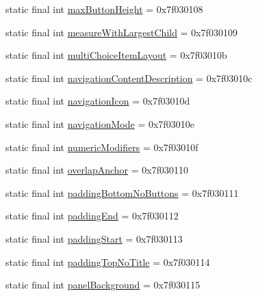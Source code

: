 \begin{DoxyCompactItemize}
static final int \mbox{\hyperlink{classandroid_1_1support_1_1v7_1_1appcompat_1_1R_1_1attr_a054ee0cbd26c24cb30705753307ccde3}{max\+Button\+Height}} = 0x7f030108
\item 
static final int \mbox{\hyperlink{classandroid_1_1support_1_1v7_1_1appcompat_1_1R_1_1attr_a421389c4bdd630f16a260d6166745aa8}{measure\+With\+Largest\+Child}} = 0x7f030109
\item 
static final int \mbox{\hyperlink{classandroid_1_1support_1_1v7_1_1appcompat_1_1R_1_1attr_aff39b926d2e9012794202b8b6f9a0d92}{multi\+Choice\+Item\+Layout}} = 0x7f03010b
\item 
static final int \mbox{\hyperlink{classandroid_1_1support_1_1v7_1_1appcompat_1_1R_1_1attr_ad1123c667a7f56bf93873c4fdd514e58}{navigation\+Content\+Description}} = 0x7f03010c
\item 
static final int \mbox{\hyperlink{classandroid_1_1support_1_1v7_1_1appcompat_1_1R_1_1attr_a2adad3c9532705970eaaa826317fba55}{navigation\+Icon}} = 0x7f03010d
\item 
static final int \mbox{\hyperlink{classandroid_1_1support_1_1v7_1_1appcompat_1_1R_1_1attr_a27c70295f7cf8714ed8f97d4e89ffb06}{navigation\+Mode}} = 0x7f03010e
\item 
static final int \mbox{\hyperlink{classandroid_1_1support_1_1v7_1_1appcompat_1_1R_1_1attr_a0da3a102e7d4ddecb4cebfe2e430c0a0}{numeric\+Modifiers}} = 0x7f03010f
\item 
static final int \mbox{\hyperlink{classandroid_1_1support_1_1v7_1_1appcompat_1_1R_1_1attr_aff68b243ea6c12550257c7d3c81c7cf8}{overlap\+Anchor}} = 0x7f030110
\item 
static final int \mbox{\hyperlink{classandroid_1_1support_1_1v7_1_1appcompat_1_1R_1_1attr_a90fe24b4eb9764c84e3c686851d716ee}{padding\+Bottom\+No\+Buttons}} = 0x7f030111
\item 
static final int \mbox{\hyperlink{classandroid_1_1support_1_1v7_1_1appcompat_1_1R_1_1attr_a70fe98d6e34a3f8cfe4c637aea1d7bd3}{padding\+End}} = 0x7f030112
\item 
static final int \mbox{\hyperlink{classandroid_1_1support_1_1v7_1_1appcompat_1_1R_1_1attr_aa716593dd9b911d645d5f24fa1d0d05f}{padding\+Start}} = 0x7f030113
\item 
static final int \mbox{\hyperlink{classandroid_1_1support_1_1v7_1_1appcompat_1_1R_1_1attr_a8b25643e217d730b7ced18a5e9ac3b51}{padding\+Top\+No\+Title}} = 0x7f030114
\item 
static final int \mbox{\hyperlink{classandroid_1_1support_1_1v7_1_1appcompat_1_1R_1_1attr_af583f6f704e006a6642ec0774511fd39}{panel\+Background}} = 0x7f030115

\end{DoxyCompactItemize}
